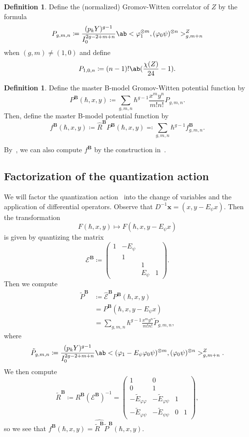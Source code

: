 \documentclass[10pt]{amsart}
\theoremstyle{definition}
\newtheorem{defn}[thm]{Definition}
\theoremstyle{remark}
\theoremstyle{plain}
\theoremstyle{definition}
\theoremstyle{remark}
\newcommand{\bB}{\mathbf{B}}
\newcommand{\bx}{\mathbf{x}}
\newcommand{\msc}[1]{\mathscr{#1}}
\newcommand{\wh}[1]{\widehat{#1}}
\newcommand{\1}{\mathbf{1}}
\newcommand{\2}{\mathbf{2}}
\newcommand{\3}{\mathbf{3}}
\numberwithin{equation}{section}
\begin{document}
\begin{defn}
    Define the (normalized) Gromov-Witten correlator of $Z$ by the formula
    \[ P_{g,m,n} \coloneqq \frac{(p_k Y)^{g-1}}{I_0^{2g-2+m+n}} \ab< \varphi_1^{\otimes m}, (\varphi_0 \psi)^{\otimes n}>_{g,m+n}^Z \]
    when $(g,m) \neq (1,0)$ and define
    \[ P_{1,0,n} \coloneqq (n-1)! \ab(\frac{\chi(Z)}{24} - 1). \]
\end{defn}
 
\begin{defn}
    Define the master B-model Gromov-Witten potential function by
    \[ P^{\bB}(\hbar, x, y) \coloneqq \sum_{g,m,n} \hbar^{g-1} \frac{x^m y^n}{m!n!} P_{g,m,n}. \]
    Then, define the master B-model potential function by
    \[ f^{\bB}(\hbar, x, y) \coloneqq \wh{R}^{\bB} P^{\bB}(\hbar, x, y) \eqqcolon \sum_{g,m,n} \hbar^{g-1} f_{g,m,n}^{\bB}. \]
\end{defn}

By~\cite[Theorem 10]{geomquantgwtheory}, we can also compute $f^{\bB}$ by the construction in~.

\subsection{Factorization of the quantization action}%
\label{sub:Factorization of the quantization action}

We will factor the quantization action~ into the change of variables and the application of differential operators. Observe that $D^{-1}\bx = (x,y-E_{\psi} x)$. Then the transformation
\[ F(\hbar, x,y) \mapsto F(\hbar, x, y-E_{\psi} x) \]
is given by quantizing the matrix
\[ \msc{E}^{\bB} \coloneqq \begin{pmatrix}
    1 & -E_{\psi} \\
     & 1 \\
    & & 1 \\
    & & E_{\psi} & 1
\end{pmatrix}.
\]
Then we compute
\begin{align*}
    \tilde{P}^{\bB} &\coloneqq \wh{\msc{E}}^{\bB} P^{\bB}(\hbar, x, y) \\
    &= P^{\bB}(\hbar, x, y-E_{\psi}x) \\
    &= \sum_{g,m,n} \hbar^{g-1} \frac{x^m y^n}{m!n!} \tilde{P}_{g,m,n},
\end{align*}
where
\[ \tilde{P}_{g,m,n} \coloneqq \frac{(p_k Y)^{g-1}}{I_0^{2g-2+m+n}}\ab<(\varphi_1 - E_{\psi} \varphi_0\psi)^{\otimes m}, (\varphi_0 \psi)^{\otimes n}>_{g,m+n}^{Z}. \]
We then compute
\[ \tilde{R}^{\bB} \coloneqq R^{\bB} (\msc{E}^{\bB})^{-1} = \begin{pmatrix}
    1 & 0 \\
    0 & 1 \\
    -\tilde{E}_{\varphi\varphi} & -\tilde{E}_{\varphi\psi} & 1 \\
    -\tilde{E}_{\varphi\psi} & -\tilde{E}_{\psi\psi} & 0 & 1
\end{pmatrix},
\]
so we see that $f^{\bB}(\hbar, x, y) = \wh{\tilde{R}^{\bB}} \tilde{P}^{\bB}(\hbar, x, y)$.
\end{document}
